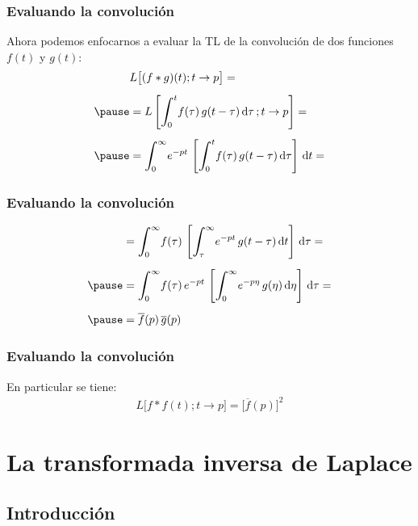 \begin{frame}
\frametitle{Evaluando la convolución}
Ahora podemos enfocarnos a evaluar la TL de la convolución de dos funciones $f (t)$ y $g (t)$:
\pause
\begin{eqnarray*}
\begin{aligned}
&L \big[  (f * g) (t); t \to p  \big] =  \\[0.5em] \pause
&= L \left[ \scaleint{6ex}_{\bs 0}^{t} f (\tau) \, g (t - \tau) \dd{\tau}; t \to p \right] = \\[0.5em] \pause
&= \scaleint{6ex}_{\bs 0}^{\infty} e^{-p t} \, \left[ \scaleint{6ex}_{\bs 0}^{t} f (\tau) \, g (t - \tau) \dd{\tau}\right] \, \dd{t} =
\end{aligned}
\end{eqnarray*}
\end{frame}
\begin{frame}
\frametitle{Evaluando la convolución}
\begin{eqnarray}
\begin{aligned}[b]
&= \scaleint{6ex}_{\bs 0}^{\infty} f (\tau) \, \left[ \scaleint{6ex}_{\bs \tau}^{\infty} e^{-p t} \, g (t - \tau) \dd{t}\right] \, \dd{\tau} = \\[0.5em] \pause
&= \scaleint{6ex}_{\bs 0}^{\infty} f(\tau) \, e^{- p t} \, \left[ \scaleint{6ex}_{\bs 0}^{\infty} e^{-p \eta} \, g (\eta) \dd{\eta} \right] \, \dd{\tau} = \\[0.5em] \pause
&= \overline{f} (p) \, \overline{g} (p)
\end{aligned}
\label{eq:ecuacion_03_59}
\end{eqnarray}
\end{frame}
\begin{frame}
\frametitle{Evaluando la convolución}
En particular se tiene:
\pause
\begin{align*}
L \big[  f * f (t); t \to p  \big] = \big[  \overline{f} (p)  \big]^{2}
\end{align*}
\end{frame}

\section{La transformada inversa de Laplace}
\subsection{Introducción}

